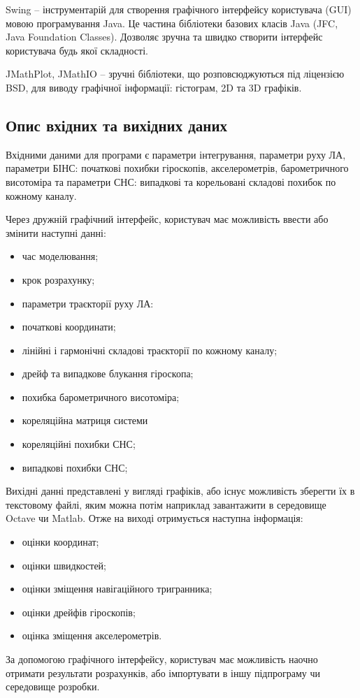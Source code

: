 Swing -- інструментарій для створення графічного інтерфейсу користувача (GUI) мовою програмування Java. Це частина бібліотеки базових класів Java (JFC, Java Foundation Classes). Дозволяє зручна та швидко створити інтерфейс користувача будь якої складності.

JMathPlot, JMathIO -- зручні бібліотеки, що розповсюджуються під ліцензією BSD, для виводу графічної інформації: гістограм, 2D та 3D графіків.

\subsection{Опис вхідних та вихідних даних}
Вхідними даними для програми є параметри інтегрування, параметри руху ЛА, параметри БІНС: початкові похибки гіроскопів, акселерометрів, барометричного висотоміра та параметри СНС: випадкові та корельовані складові похибок по кожному каналу. 

Через дружній графічний інтерфейс, користувач має можливість ввести або змінити наступні данні:
\begin{itemize}
  \item час моделювання;
  \item крок розрахунку;
  \item параметри траєкторії руху ЛА:
  \item початкові координати;
  \item лінійні і гармонічні складові траєкторії по кожному каналу;
  \item дрейф та випадкове блукання гіроскопа;
  \item похибка барометричного висотоміра;
  \item кореляційна матриця системи
  \item кореляційні похибки СНС;
  \item випадкові похибки СНС;
\end{itemize}
Вихідні данні представлені у вигляді графіків, або існує можливість зберегти їх в текстовому файлі, яким можна потім наприклад завантажити в середовище Octave чи Matlab. Отже на виході отримується наступна інформація: 
\begin{itemize}
  \item оцінки координат;
  \item оцінки швидкостей;
  \item оцінки зміщення навігаційного тригранника;
  \item оцінки дрейфів гіроскопів;
  \item оцінка зміщення акселерометрів.
\end{itemize}
За допомогою графічного інтерфейсу, користувач має можливість наочно отримати результати розрахунків, або імпортувати в іншу підпрограму чи середовище розробки.

